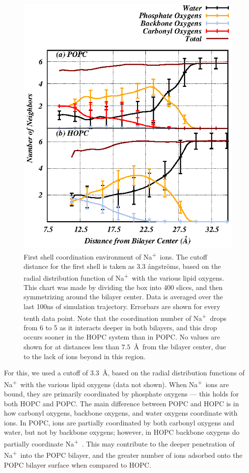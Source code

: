 \documentclass[12pt,openany,final]{book}
\newcommand{\na}{Na\textsuperscript{+}~}
\newcommand{\aangstroms}{{\aa}ngstr{\"o}ms}
\begin{document}
\begin{figure}[p]
    \caption[First shell coordination environment of \na ions.]{ 
First shell coordination environment of \na ions. The cutoff distance for the first shell is taken as 3.3 
\aangstroms, based on the radial distribution function of \na with the various lipid oxygens.
This chart was made by dividing the box into 400 slices, and then symmetrizing around the bilayer 
center. Data is averaged over the last 100ns of simulation trajectory. Errorbars are shown for every tenth data point. 
Note that the coordination number of \na drops from 6 to 5 as it interacts deeper in both bilayers, and
this drop occurs sooner in the HOPC system than in POPC. 
No values are shown for at distances less than $7.5$~\AA~from the bilayer center, due to the lack of ions beyond in this region. 
}
\label{fig:cationcood}
\includegraphics[height=0.66\textheight]{cood.eps}
\end{figure}
For this, we used a cutoff
of 3.3~\AA, based on the radial distribution functions of \na with the
various lipid oxygens (data not shown). When \na ions are bound, they are primarily coordinated by 
phosphate oxygens --- this holds for both HOPC and POPC. The main difference between POPC and HOPC is 
in how carbonyl oxygens, backbone oxygens, and water oxygens coordinate with ions. In POPC, ions are partially 
coordinated by both carbonyl oxygens and water, but not by backbone oxygens; however, in HOPC backbone oxygens do partially coordinate \na. 
This may contribute to the deeper penetration of \na into the POPC bilayer, and the greater number of ions adsorbed onto the POPC
bilayer surface when compared to HOPC.
\end{document}
